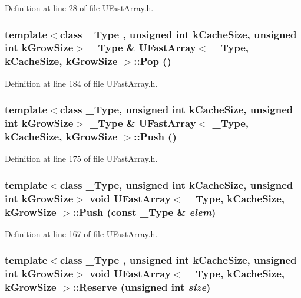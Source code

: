 Definition at line 28 of file UFastArray.h.\hypertarget{class_u_fast_array_fc4eda064bb9ee287f6217cb81a4fef8}{
\subsubsection[{Pop}]{\setlength{\rightskip}{0pt plus 5cm}template$<$class \_\-Type , unsigned int kCacheSize, unsigned int kGrowSize$>$ \_\-Type \& {\bf UFastArray}$<$ \_\-Type, kCacheSize, kGrowSize $>$::Pop ()}}
\label{class_u_fast_array_fc4eda064bb9ee287f6217cb81a4fef8}




Definition at line 184 of file UFastArray.h.\hypertarget{class_u_fast_array_b2c21774ba42f9480a447095d4dde0ed}{
\subsubsection[{Push}]{\setlength{\rightskip}{0pt plus 5cm}template$<$class \_\-Type, unsigned int kCacheSize, unsigned int kGrowSize$>$ \_\-Type \& {\bf UFastArray}$<$ \_\-Type, kCacheSize, kGrowSize $>$::Push ()}}
\label{class_u_fast_array_b2c21774ba42f9480a447095d4dde0ed}




Definition at line 175 of file UFastArray.h.\hypertarget{class_u_fast_array_23fd2ded4aa241f76b313a925861c828}{
\subsubsection[{Push}]{\setlength{\rightskip}{0pt plus 5cm}template$<$class \_\-Type, unsigned int kCacheSize, unsigned int kGrowSize$>$ void {\bf UFastArray}$<$ \_\-Type, kCacheSize, kGrowSize $>$::Push (const \_\-Type \& {\em elem})}}
\label{class_u_fast_array_23fd2ded4aa241f76b313a925861c828}




Definition at line 167 of file UFastArray.h.\hypertarget{class_u_fast_array_aab86583bca71336ee7122bc77aa861e}{
\subsubsection[{Reserve}]{\setlength{\rightskip}{0pt plus 5cm}template$<$class \_\-Type , unsigned int kCacheSize, unsigned int kGrowSize$>$ void {\bf UFastArray}$<$ \_\-Type, kCacheSize, kGrowSize $>$::Reserve (unsigned int {\em size})}}
\label{class_u_fast_array_aab86583bca71336ee7122bc77aa861e}




